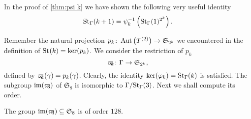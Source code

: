 \begin{rem}
In the proof of \cref{thm:psi k} we have shown the following very useful identity
\begin{equation*}
\St[\Gamma]{k+1}=\psi_{k}^{-1}\left(\St[\Gamma]{1}^{2^k}\right).
\end{equation*}
\end{rem}
Remember the natural projection $p_k\colon\AutT\to\mathfrak{S}_{2^k}$ we encountered in the definition of $\St{k}=\ker(p_k)$. We consider the restriction of $p_k$
\begin{equation*}
\varpikern_k\colon\Gamma\to\mathfrak{S}_{2^k},
\end{equation*}
defined by $\varpikern_k(\gamma)=p_k(\gamma)$. Clearly, the identity $\ker(\varphi_k)=\St[\Gamma]{k}$ is satisfied. The subgroup $\im(\varpikern_3)$ of $\mathfrak{S}_8$ is isomorphic to $\nicefrac{\Gamma}{\St[\Gamma]{3}}$. Next we shall compute its order.
\begin{pro}\label{thm:pi Gamma}
The group $\im(\varpikern_3)\subseteq\mathfrak{S}_8$ is of order $128$.
\end{pro}
